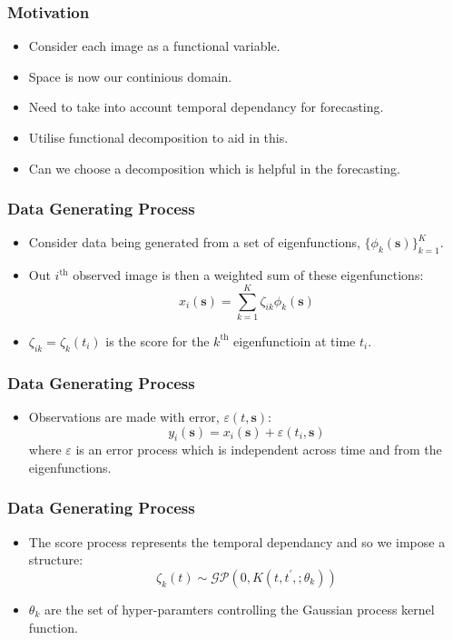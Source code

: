 \documentclass[aspectratio=169]{beamer}
\newcommand{\ve}[1]{\bm{{#1}}}
\begin{document}
  \begin{frame}
    \frametitle{Motivation}
    \begin{itemize}
      \item Consider each image as a functional variable.
      \item Space is now our continious domain. 
      \item Need to take into account temporal dependancy for forecasting.
      \item Utilise functional decomposition to aid in this. 
      \item Can we choose a decomposition which is helpful in the forecasting. 
    \end{itemize}
  \end{frame}

  \begin{frame}
    \frametitle{Data Generating Process}
    \begin{itemize}
      \item Consider data being generated from a set of eigenfunctions, $\{\phi_k(\ve{s})\}_{k=1}^K$. 
      \item Out $i^\text{th}$ observed image is then a weighted sum of these eigenfunctions: 
        \begin{equation}
          x_i(\ve{s}) = \sum_{k=1}^K \zeta_{ik} \phi_k(\ve{s})
          \label{eqn:ef}
        \end{equation}
      \item $\zeta_{ik} = \zeta_k(t_i)$ is the score for the $k^\text{th}$ eigenfunctioin at time $t_i$.
    \end{itemize}
  \end{frame}

  \begin{frame}
    \frametitle{Data Generating Process}
    \begin{itemize}
      \item Observations are made with error, $\varepsilon(t, \ve{s})$:
        \begin{equation}
          y_i(\ve{s}) = x_i(\ve{s}) + \varepsilon(t_i, \ve{s})
          \label{eqn:ef_err}
        \end{equation}
        where $\varepsilon$ is an error process which is independent across time and from the eigenfunctions. 
    \end{itemize}
  \end{frame}

  \begin{frame}
    \frametitle{Data Generating Process}
    \begin{itemize}
      \item The score process represents the temporal dependancy and so we impose a structure:
        \begin{equation}
          \zeta_k(t) \sim \mathcal{GP}\left( 0, K(t, t^\prime, ; \theta_k) \right)
          \label{eqnLscores}
        \end{equation}
      \item $\theta_k$ are the set of hyper-paramters controlling the Gaussian process kernel function.
    \end{itemize}
  \end{frame}
\end{document}
